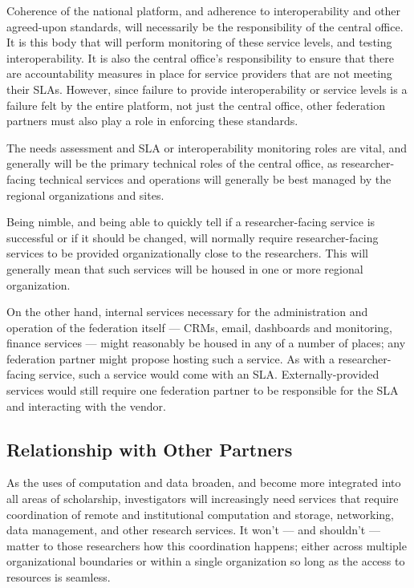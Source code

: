 \documentclass[11pt, letterpaper, twoside]{article}
\begin{document}

Coherence of the national platform, and adherence to interoperability
and other agreed-upon standards, will necessarily be the responsibility
of the central office. It is this body that will perform monitoring of
these service levels, and testing interoperability. It is also the
central office's responsibility to ensure that there are accountability
measures in place for service providers that are not meeting their SLAs.
However, since failure to provide interoperability or service levels is
a failure felt by the entire platform, not just the central office,
other federation partners must also play a role in enforcing these
standards.

The needs assessment and SLA or interoperability monitoring roles are
vital, and generally will be the primary technical roles of the central
office, as researcher-facing technical services and operations will
generally be best managed by the regional organizations and sites.


Being nimble, and being able to quickly tell if a researcher-facing
service is successful or if it should be changed, will normally require
researcher-facing services to be provided organizationally close to the
researchers. This will generally mean that such services will be housed
in one or more regional organization.

On the other hand, internal services necessary for the administration
and operation of the federation itself --- CRMs, email, dashboards and
monitoring, finance services --- might reasonably be housed in any of a
number of places; any federation partner might propose hosting such a
service.  As with a researcher-facing service, such a service would come
with an SLA.  Externally-provided services would still require one
federation partner to be responsible for the SLA and interacting with
the vendor.

\subsection*{Relationship with Other Partners}
%

As the uses of computation and data broaden, and become more integrated
into all areas of scholarship, investigators will increasingly need
services that require coordination of remote and institutional
computation and storage, networking, data management, and other research
services. It won't --- and shouldn't --- matter to those researchers how
this coordination happens; either across multiple organizational
boundaries or within a single organization so long as the access to
resources is seamless.
\end{document}
